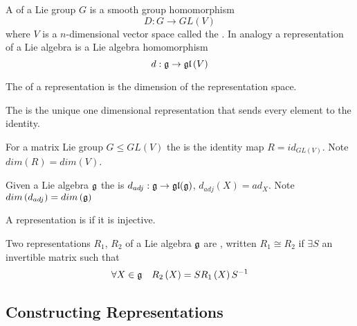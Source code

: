 \documentclass{article}
\begin{document}
\begin{definition}[Representations]
A  of a Lie group $G$ is a smooth group homomorphism 
\[
D:G\to GL\left(V\right)
\]
where $V$ is a $n$-dimensional vector space called the .
In analogy a representation of a Lie algebra is a Lie algebra homomorphism 
\[
d:\mathfrak{g} \to \mathfrak{gl}\left(V\right)
\]
\end{definition}

\begin{definition}[Dimension]
The  of a representation is the dimension of the representation space.
\end{definition}

\begin{definition} 
The  is the unique one dimensional representation that sends every element to the identity. 
\end{definition}

\begin{definition}
For a matrix Lie group $G\leq GL(V)$ the  is the identity map $R=id_{GL(V)}$. Note $dim\left(R\right)=dim\left(V\right)$.
\end{definition}

\begin{definition}
Given a Lie algebra $\mathfrak{g}$ the  is $d_{adj}:\mathfrak{g}\to\mathfrak{gl}(\mathfrak{g})$, $d_{adj}\left(X\right)=ad_X $. Note $dim\left(d_{adj}\right)=dim\left(\mathfrak{g}\right)$
\end{definition}

\begin{definition}
A representation is  if it is injective. 
\end{definition}

\begin{definition}
Two representations $R_1$, $R_2$ of a Lie algebra $\mathfrak{g}$ are , written $R_1 \cong R_2$ if $\exists S$ an invertible matrix such that 
\[
\forall X\in\mathfrak{g} \quad R_2\left(X\right)=S R_1\left(X\right) S^{-1}
\]
\end{definition}
\subsection{Constructing Representations}
\end{document}
